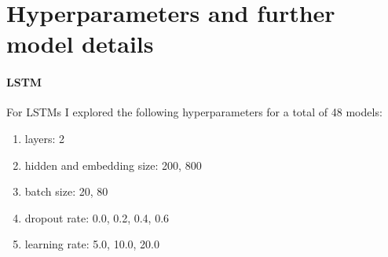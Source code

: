 \documentclass{article}
\begin{document}
\section*{Hyperparameters and further model details}
\paragraph{LSTM} For LSTMs I explored the following hyperparameters for a total of 48 models:

\begin{enumerate}
    \item layers: 2
    \item hidden and embedding size: 200, 800
    \item batch size: 20, 80 
    \item dropout rate: 0.0, 0.2, 0.4, 0.6 
    \item learning rate: 5.0, 10.0, 20.0
\end{enumerate}
\end{document}
